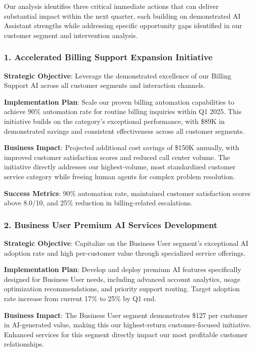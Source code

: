 \documentclass[
  letterpaper,
  DIV=11,
  numbers=noendperiod]{scrartcl}
\begin{document}
Our analysis identifies three critical immediate actions that can
deliver substantial impact within the next quarter, each building on
demonstrated AI Assistant strengths while addressing specific
opportunity gaps identified in our customer segment and intervention
analysis.

\subsubsection{1. Accelerated Billing Support Expansion
Initiative}\label{accelerated-billing-support-expansion-initiative}

\textbf{Strategic Objective}: Leverage the demonstrated excellence of
our Billing Support AI across all customer segments and interaction
channels.

\textbf{Implementation Plan}: Scale our proven billing automation
capabilities to achieve 90\% automation rate for routine billing
inquiries within Q1 2025. This initiative builds on the category's
exceptional performance, with \$89K in demonstrated savings and
consistent effectiveness across all customer segments.

\textbf{Business Impact}: Projected additional cost savings of \$150K
annually, with improved customer satisfaction scores and reduced call
center volume. The initiative directly addresses our highest-volume,
most standardized customer service category while freeing human agents
for complex problem resolution.

\textbf{Success Metrics}: 90\% automation rate, maintained customer
satisfaction scores above 8.0/10, and 25\% reduction in billing-related
escalations.

\subsubsection{2. Business User Premium AI Services
Development}\label{business-user-premium-ai-services-development}

\textbf{Strategic Objective}: Capitalize on the Business User segment's
exceptional AI adoption rate and high per-customer value through
specialized service offerings.

\textbf{Implementation Plan}: Develop and deploy premium AI features
specifically designed for Business User needs, including advanced
account analytics, usage optimization recommendations, and priority
support routing. Target adoption rate increase from current 17\% to 25\%
by Q1 end.

\textbf{Business Impact}: The Business User segment demonstrates \$127
per customer in AI-generated value, making this our highest-return
customer-focused initiative. Enhanced services for this segment directly
impact our most profitable customer relationships.
\end{document}
